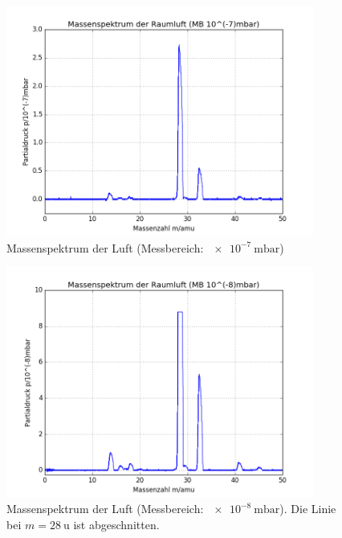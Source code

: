 \begin{figure}[tb]
	\centering\includegraphics[width=0.9\textwidth]{fig/a4_1.png}
	\caption{Massenspektrum der Luft (Messbereich: $\SI{e-7}{\milli\bar}$)}
	\label{fig:v41}
\end{figure}

\begin{figure}[tb]
	\centering\includegraphics[width=0.9\textwidth]{fig/a4_2.png}
	\caption{Massenspektrum der Luft (Messbereich: $\SI{e-8}{\milli\bar}$). Die Linie bei $m=\SI{28}{\amu}$ ist abgeschnitten.}
	\label{fig:v42}
\end{figure}

